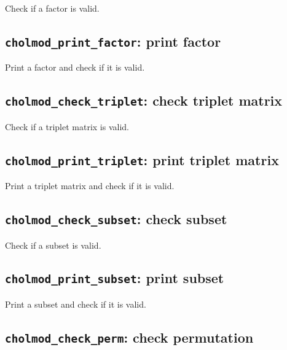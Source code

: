 \documentclass[11pt]{article}
\begin{document}

Check if a factor is valid.

\subsection{{\tt cholmod\_print\_factor}: print factor}


Print a factor and check if it is valid.

\subsection{{\tt cholmod\_check\_triplet}: check triplet matrix}


Check if a triplet matrix is valid.

\subsection{{\tt cholmod\_print\_triplet}: print triplet matrix}


Print a triplet matrix and check if it is valid.

\subsection{{\tt cholmod\_check\_subset}: check subset}


Check if a subset is valid.

\subsection{{\tt cholmod\_print\_subset}: print subset}


Print a subset and check if it is valid.

\subsection{{\tt cholmod\_check\_perm}: check permutation}
\end{document}
